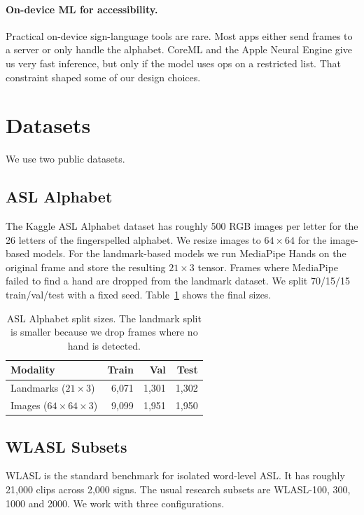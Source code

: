 \documentclass[11pt]{article}
\begin{document}
\paragraph{On-device ML for accessibility.} Practical on-device sign-language tools are rare. Most apps either send frames to a server or only handle the alphabet. CoreML and the Apple Neural Engine give us very fast inference, but only if the model uses ops on a restricted list. That constraint shaped some of our design choices.

\section{Datasets}

We use two public datasets.

\subsection{ASL Alphabet}

The Kaggle ASL Alphabet dataset has roughly 500 RGB images per letter for the 26 letters of the fingerspelled alphabet. We resize images to $64\times64$ for the image-based models. For the landmark-based models we run MediaPipe Hands on the original frame and store the resulting $21\times3$ tensor. Frames where MediaPipe failed to find a hand are dropped from the landmark dataset. We split 70/15/15 train/val/test with a fixed seed. Table~\ref{tab:asl-alphabet-splits} shows the final sizes.

\begin{table}[t]
\centering
\small
\begin{tabular}{lrrr}
\toprule
Modality & Train & Val & Test \\
\midrule
Landmarks ($21\times3$) & 6{,}071 & 1{,}301 & 1{,}302 \\
Images ($64\times64\times3$) & 9{,}099 & 1{,}951 & 1{,}950 \\
\bottomrule
\end{tabular}
\caption{ASL Alphabet split sizes. The landmark split is smaller because we drop frames where no hand is detected.}
\label{tab:asl-alphabet-splits}
\end{table}

\subsection{WLASL Subsets}

WLASL \citep{li2020wlasl} is the standard benchmark for isolated word-level ASL. It has roughly 21{,}000 clips across 2{,}000 signs. The usual research subsets are WLASL-100, 300, 1000 and 2000. We work with three configurations.
\end{document}
